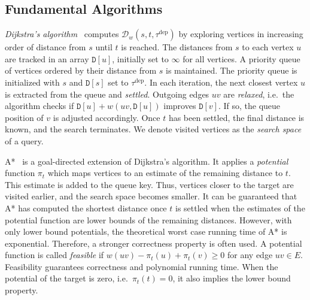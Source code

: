 \documentclass[a4paper,UKenglish,cleveref, autoref, thm-restate]{lipics-v2021}
\newcommand*{\dist}{\mathcal{D}}
\newcommand*{\tdep}{\tau^{\operatorname{dep}}}
\begin{document}
\subsection{Fundamental Algorithms}

\emph{Dijkstra's algorithm}~\cite{d-ntpcg-59} computes $\dist_w(s,t,\tdep)$ by exploring vertices in increasing order of distance from $s$ until $t$ is reached.
The distances from $s$ to each vertex $u$ are tracked in an array $\mathtt{D}[u]$, initially set to $\infty$ for all vertices.
A priority queue of vertices ordered by their distance from $s$ is maintained.
The priority queue is initialized with $s$ and $\mathtt{D}[s]$ set to $\tdep$.
In each iteration, the next closest vertex $u$ is extracted from the queue and \emph{settled}.
Outgoing edges $uv$ are \emph{relaxed}, i.e.\ the algorithm checks if $\mathtt{D}[u] + w(uv, \mathtt{D}[u])$ improves $\mathtt{D}[v]$.
If so, the queue position of $v$ is adjusted accordingly.
Once $t$ has been settled, the final distance is known, and the search terminates.
We denote visited vertices as the \emph{search space} of a query.

A*~\cite{hnr-afbhd-68} is a goal-directed extension of Dijkstra's algorithm.
It applies a \emph{potential} function $\pi_t$ which maps vertices to an estimate of the remaining distance to $t$.
This estimate is added to the queue key.
Thus, vertices closer to the target are visited earlier, and the search space becomes smaller.
It can be guaranteed that A* has computed the shortest distance once $t$ is settled when the estimates of the potential function are lower bounds of the remaining distances.
However, with only lower bound potentials, the theoretical worst case running time of A* is exponential.
Therefore, a stronger correctness property is often used.
A potential function is called \emph{feasible} if $w(uv) - \pi_t(u) + \pi_t(v) \geq 0$ for any edge $uv \in E$.
Feasibility guarantees correctness and polynomial running time.
When the potential of the target is zero, i.e.\ $\pi_t(t) = 0$, it also implies the lower bound property.

\end{document}
